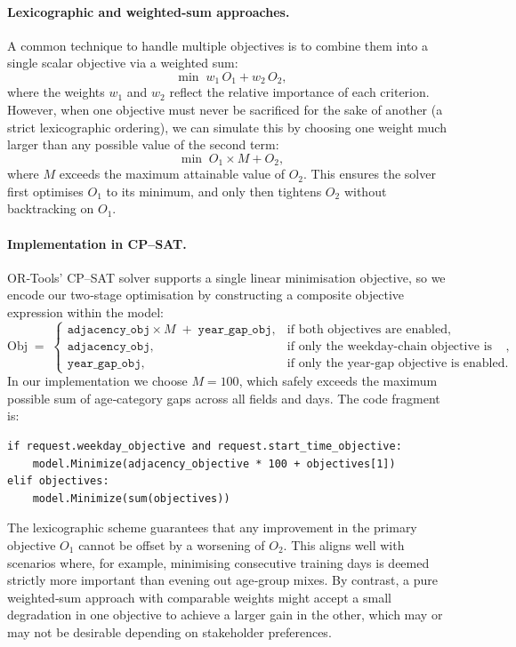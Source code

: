 \documentclass[12pt]{article}
\begin{document}
\paragraph{Lexicographic and weighted‐sum approaches.}
A common technique to handle multiple objectives is to combine them into a single scalar objective via a weighted sum:
\[
\min\; w_1\,O_1 + w_2\,O_2,
\]
where the weights \(w_1\) and \(w_2\) reflect the relative importance of each criterion. However, when one objective must never be sacrificed for the sake of another (a strict lexicographic ordering), we can simulate this by choosing one weight much larger than any possible value of the second term:
\[
\min\; O_1 \times M + O_2,
\]
where \(M\) exceeds the maximum attainable value of \(O_2\). This ensures the solver first optimises \(O_1\) to its minimum, and only then tightens \(O_2\) without backtracking on \(O_1\).

\paragraph{Implementation in CP–SAT.}
OR‐Tools’ CP–SAT solver supports a single linear minimisation objective, so we encode our two‐stage optimisation by constructing a composite objective expression within the model:
\[
  \mathrm{Obj} \;=\; 
  \begin{cases}
    \texttt{adjacency\_obj} \times M \;+\;\texttt{year\_gap\_obj}, & \text{if both objectives are enabled},\\
    \texttt{adjacency\_obj}, & \text{if only the weekday‐chain objective is enabled},\\
    \texttt{year\_gap\_obj}, & \text{if only the year‐gap objective is enabled}.
  \end{cases}
\]
In our implementation we choose \(M=100\), which safely exceeds the maximum possible sum of age‐category gaps across all fields and days. The code fragment is:
\begin{verbatim}
if request.weekday_objective and request.start_time_objective:
    model.Minimize(adjacency_objective * 100 + objectives[1])
elif objectives:
    model.Minimize(sum(objectives))
\end{verbatim}

The lexicographic scheme guarantees that any improvement in the primary objective \(O_1\) cannot be offset by a worsening of \(O_2\). This aligns well with scenarios where, for example, minimising consecutive training days is deemed strictly more important than evening out age‐group mixes. By contrast, a pure weighted‐sum approach with comparable weights might accept a small degradation in one objective to achieve a larger gain in the other, which may or may not be desirable depending on stakeholder preferences.
\end{document}
